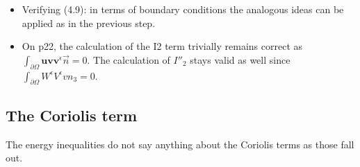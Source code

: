 \documentclass[11pt]{article}
\begin{document}
\begin{itemize}
   using the divergence-free condition and $\mathbf{u}^\epsilon = 0$ on $\partial \Omega.$
   
   \item Verifying (4.9): in terms of boundary conditions the analogous ideas can be applied as in the previous step.
   
   \item On p22, the calculation of the I2 term trivially remains correct as $\int_{\partial \Omega} \mathbf{u} \mathbf{v} \mathbf{v}^\epsilon \vec{n} = 0.$ The calculation of $I''_2$ stays valid as well since
   $\int_{\partial \Omega} W^\epsilon V^\epsilon v n_3 = 0.$

\end{itemize}

\subsection{The Coriolis term}

The energy inequalities do not say anything about the Coriolis terms as those fall out.
\end{document}
